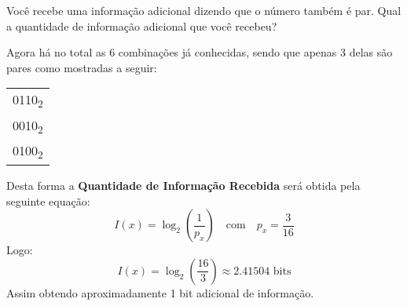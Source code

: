 \documentclass[es572.tex]{subfiles}
\begin{document}
            \begin{exercise}
                Você recebe uma informação adicional dizendo que o número também é par. Qual a quantidade de informação adicional que você recebeu?
            \end{exercise}
            \begin{resolution}
                Agora há no total as 6 combinações já conhecidas, sendo que apenas 3 delas são pares como mostradas a seguir:
                    \begin{table}[H]
                        \centering
                        \begin{tabular}[]{c}\hline
                            0110\textsubscript{2}\\
                            0010\textsubscript{2}\\
                            0100\textsubscript{2}\\\hline
                        \end{tabular}
                    \end{table}\noindent
                Desta forma a \textbf{Quantidade de Informação Recebida} será obtida pela seguinte equação:
                    \begin{equation*}
                        I(x) = \log_{2}\left(\frac{1}{p_{x}}\right)
                        \quad\text{com}\quad
                        p_{x} = \frac{3}{16}
                    \end{equation*}
                Logo:
                    \begin{equation*}
                        I(x) = \log_{2}\left(\frac{16}{3}\right) \approx 2.41504 \text{ bits}
                    \end{equation*}
                Assim obtendo aproximadamente 1 bit adicional de informação.
            \end{resolution}
\end{document}
